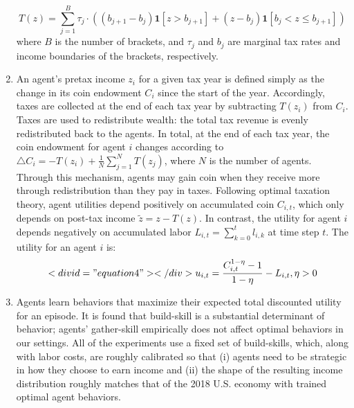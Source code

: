 \documentclass{article}
\begin{document}
\begin{enumerate}
\begin{equation}
T(z) = \sum_{j = 1}^{B} \tau_{j} \cdot ((b_{j + 1} - b_{j}) \mathbf{1} [z > b_{j + 1}] + (z - b_{j}) \mathbf{1} [b_{j} < z \leq b_{j + 1}])
\end{equation}
where \( B \) is the number of brackets, and \( \tau_{j} \) and \( b_{j} \) are marginal tax rates and income boundaries of the brackets, respectively.

\item An agent’s pretax income \( z_{i} \) for a given tax year is defined simply as the change in its coin endowment \( C_{i} \) since the start of the year. Accordingly, taxes are collected at the end of each tax year by subtracting \( T(z_{i}) \) from \( C_{i} \). Taxes are used to redistribute wealth: the total tax revenue is evenly redistributed back to the agents. In total, at the end of each tax year, the coin endowment for agent \( i \) changes according to \( \bigtriangleup C_{i} = - T(z_{i}) + \frac{1}{N} \sum_{j = 1}^{N} T(z_{j}) \), where \( N \) is the number of agents. Through this mechanism, agents may gain coin when they receive more through redistribution than they pay in taxes. Following optimal taxation theory, agent utilities depend positively on accumulated coin \( C_{i, t} \), which only depends on post-tax income \( \tilde{z}= z - T(z) \). In contrast, the utility for agent \( i \) depends negatively on accumulated labor \( L_{i, t} = \sum_{k = 0}^{t} l_{i, k} \) at time step \( t \). The utility for an agent \( i \) is:
\begin{equation}<div id="equation4"></div>

u_{i, t} = \frac{C^{1 - \eta}_{i, t} - 1}{1 - \eta} - L_{i, t}, \eta > 0
\end{equation}

\item Agents learn behaviors that maximize their expected total discounted utility for an episode. It is found that build-skill is a substantial determinant of behavior; agents’ gather-skill empirically does not affect optimal behaviors in our settings. All of the experiments use a fixed set of build-skills, which, along with labor costs, are roughly calibrated so that (i) agents need to be strategic in how they choose to earn income and (ii) the shape of the resulting income distribution roughly matches that of the 2018 U.S. economy with trained optimal agent behaviors.


\end{enumerate}
\end{document}

